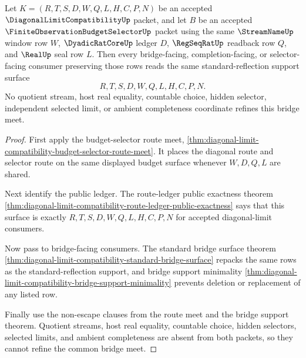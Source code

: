\begin{theorem}
\label{thm:diagonal-limit-compatibility-budget-selector-bridge-meet-exactness}
Let $K=(R,T,S,D,W,Q,L,H,C,P,N)$ be an accepted $\DiagonalLimitCompatibilityUp$ packet, and let $B$ be an accepted $\FiniteObservationBudgetSelectorUp$ packet using the same $\StreamNameUp$ window row $W$, $\DyadicRatCoreUp$ ledger $D$, $\RegSeqRatUp$ readback row $Q$, and $\RealUp$ seal row $L$. Then every bridge-facing, completion-facing, or selector-facing consumer preserving those rows reads the same standard-reflection support surface
$$
R,T,S,D,W,Q,L,H,C,P,N.
$$
No quotient stream, host real equality, countable choice, hidden selector, independent selected limit, or ambient completeness coordinate refines this bridge meet.
\end{theorem}
\begin{proof}
First apply the budget-selector route meet, \autoref{thm:diagonal-limit-compatibility-budget-selector-route-meet}. It places the diagonal route and selector route on the same displayed budget surface whenever $W,D,Q,L$ are shared.

Next identify the public ledger. The route-ledger public exactness theorem \autoref{thm:diagonal-limit-compatibility-route-ledger-public-exactness} says that this surface is exactly $R,T,S,D,W,Q,L,H,C,P,N$ for accepted diagonal-limit consumers.

Now pass to bridge-facing consumers. The standard bridge surface theorem \autoref{thm:diagonal-limit-compatibility-standard-bridge-surface} repacks the same rows as the standard-reflection support, and bridge support minimality \autoref{thm:diagonal-limit-compatibility-bridge-support-minimality} prevents deletion or replacement of any listed row.

Finally use the non-escape clauses from the route meet and the bridge support theorem. Quotient streams, host real equality, countable choice, hidden selectors, selected limits, and ambient completeness are absent from both packets, so they cannot refine the common bridge meet.
\end{proof}



